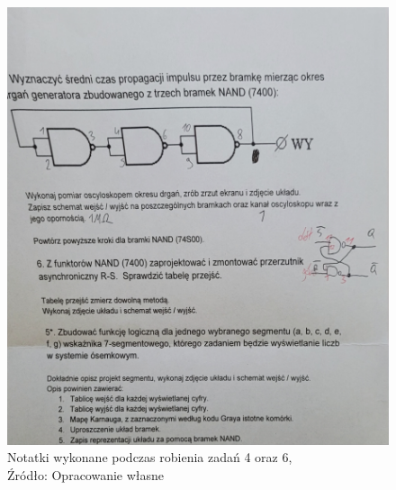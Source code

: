 \documentclass{article}
\begin{document}
\begin{figure}[!ht]
\begin{minipage}{.5\textwidth}
      \includegraphics[scale=0.08]{grafiki/notatki2.jpg}
      \caption{Notatki wykonane podczas robienia zadań 4 oraz 6,
      \\Źródło: Opracowanie własne}
    \end{minipage}
  \end{figure}
\end{document}

